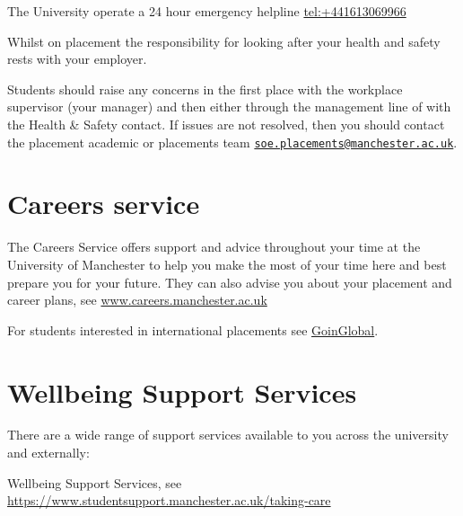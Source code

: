 \documentclass[
]{book}
\begin{document}
The University operate a 24 hour emergency helpline \url{tel:+441613069966}

Whilst on placement the responsibility for looking after your health and safety rests with your employer.

Students should raise any concerns in the first place with the workplace supervisor (your manager) and then either through the management line of with the Health \& Safety contact. If issues are not resolved, then you should contact the placement academic or placements team \href{mailto:soe.placements@manchester.ac.uk}{\nolinkurl{soe.placements@manchester.ac.uk}}.

\section{Careers service}\label{careers}

The Careers Service offers support and advice throughout your time at the University of Manchester to help you make the most of your time here and best prepare you for your future. They can also advise you about your placement and career plans, see \href{https://www.careers.manchester.ac.uk/}{www.careers.manchester.ac.uk} \citep{careers}

For students interested in international placements see \href{https://www.careers.manchester.ac.uk/international/goinglobal/}{GoinGlobal}. \citep{goinglobal}

\section{Wellbeing Support Services}\label{wellbeing}

There are a wide range of support services available to you across the university and externally:

Wellbeing Support Services, see \href{https://www.studentsupport.manchester.ac.uk/taking-care/}{https://www.studentsupport.manchester.ac.uk/taking-care} \citep{wellbeing}
\end{document}
